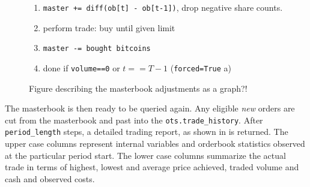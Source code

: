 \begin{figure}[ht]
	\centering
	\begin{enumerate}
	\item \lstinline!master += diff(ob[t] - ob[t-1])!, drop negative share counts.
	\item perform trade: buy until given limit
	\item \lstinline!master -= bought bitcoins!
	\item done if \lstinline!volume==0! or $t==T-1$ (\lstinline!forced=True! a)
	\end{enumerate}
	\caption{Figure describing the masterbook adjustments as a graph?!}
	\label{fig:masterbookadjustments}
\end{figure}

The masterbook is then ready to be queried again. Any eligible \emph{new} orders are cut from the masterbook and past into the \lstinline!ots.trade_history!. After \lstinline!period_length! steps, a detailed trading report, as shown in  is returned. The upper case columns represent internal variables and orderbook statistics observed at the particular period start. The lower case columns summarize the actual trade in terms of highest, lowest and average price achieved, traded volume and cash and observed costs.\\

\begin{table}
\centering
{}
\caption{Trading history, as returned after four consecutive calls of \lstinline!ots.trade()!.}
\label{tab:tradinghistory}
\end{table}

